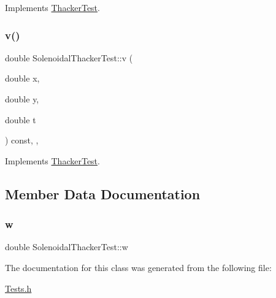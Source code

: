 Implements \hyperlink{classThackerTest_a622e4cd3846a7e6ea906111b6be6a0b7}{Thacker\+Test}.

\mbox{\label{classSolenoidalThackerTest_a87487f308128e5ca961481dd75da6abf}} 
\subsubsection{\texorpdfstring{v()}{v()}}
{\footnotesize\ttfamily double Solenoidal\+Thacker\+Test\+::v (\begin{DoxyParamCaption}\item[{double}]{x,  }\item[{double}]{y,  }\item[{double}]{t }\end{DoxyParamCaption}) const\hspace{0.3cm}{\ttfamily [inline]}, {\ttfamily [override]}, {\ttfamily [virtual]}}



Implements \hyperlink{classThackerTest_a445339d59012efde1e6d27ab060b6781}{Thacker\+Test}.



\subsection{Member Data Documentation}
\mbox{\label{classSolenoidalThackerTest_a345933b23bbeb284aafa1c38d1600ff9}} 
\subsubsection{\texorpdfstring{w}{w}}
{\footnotesize\ttfamily double Solenoidal\+Thacker\+Test\+::w\hspace{0.3cm}{\ttfamily [private]}}



The documentation for this class was generated from the following file\+:\begin{DoxyCompactItemize}
\item 
\hyperlink{Tests_8h}{Tests.\+h}\end{DoxyCompactItemize}
